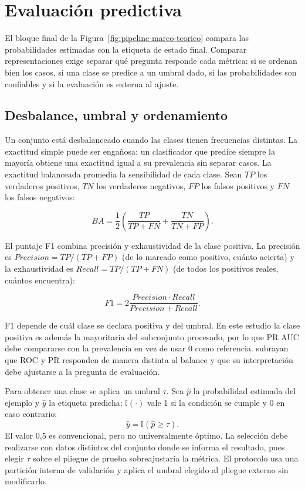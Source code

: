 \section{Evaluación predictiva}
\label{sec:evaluacion_predictiva}

El bloque final de la Figura~\ref{fig:pipeline-marco-teorico} compara las probabilidades estimadas con la etiqueta de estado final. Comparar representaciones exige separar qué pregunta responde cada métrica: si se ordenan bien los casos, si una clase se predice a un umbral dado, si las probabilidades son confiables y si la evaluación es externa al ajuste.

\subsection{Desbalance, umbral y ordenamiento}

Un conjunto está desbalanceado cuando las clases tienen frecuencias distintas. La exactitud simple puede ser engañosa: un clasificador que predice siempre la mayoría obtiene una exactitud igual a su prevalencia sin separar casos. La exactitud balanceada promedia la sensibilidad de cada clase. Sean $TP$ los verdaderos positivos, $TN$ los verdaderos negativos, $FP$ los falsos positivos y $FN$ los falsos negativos:

\begin{equation}
  BA=\frac{1}{2}\left(\frac{TP}{TP+FN}+\frac{TN}{TN+FP}\right).
\end{equation}

El puntaje F1 combina precisión y exhaustividad de la clase positiva. La precisión es $Precision=TP/(TP+FP)$ (de lo marcado como positivo, cuánto acierta) y la exhaustividad es $Recall=TP/(TP+FN)$ (de todos los positivos reales, cuántos encuentra):

\begin{equation}
  F1=2\frac{Precision\cdot Recall}{Precision+Recall}.
\end{equation}

F1 depende de cuál clase se declara positiva y del umbral. En este estudio la clase positiva es además la mayoritaria del subconjunto procesado, por lo que PR AUC debe compararse con la prevalencia en vez de usar 0 como referencia. \textcite{richardson2024roc} subrayan que ROC y PR responden de manera distinta al balance y que su interpretación debe ajustarse a la pregunta de evaluación.

Para obtener una clase se aplica un umbral $\tau$. Sea $\hat p$ la probabilidad estimada del ejemplo y $\hat y$ la etiqueta predicha; $\mathbb{I}(\cdot)$ vale 1 si la condición se cumple y 0 en caso contrario:
\begin{equation}
  \hat y=\mathbb{I}(\hat p\geq\tau).
\end{equation}
El valor 0,5 es convencional, pero no universalmente óptimo. La selección debe realizarse con datos distintos del conjunto donde se informa el resultado, pues elegir $\tau$ sobre el pliegue de prueba sobreajustaría la métrica. El protocolo usa una partición interna de validación y aplica el umbral elegido al pliegue externo sin modificarlo.

